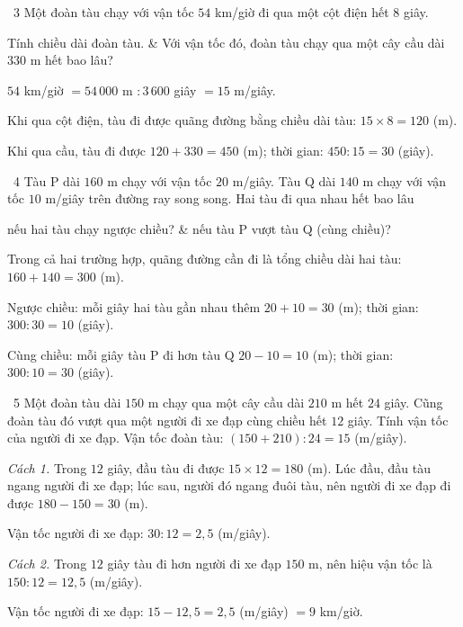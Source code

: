 \gap
\begin{exbox}{\ExWord\ 3}
Một đoàn tàu chạy với vận tốc $54$ km/giờ đi qua một cột điện hết $8$ giây.
\begin{cols2}
 Tính chiều dài đoàn tàu. &  Với vận tốc đó, đoàn tàu chạy qua một cây cầu dài $330$ m hết bao lâu?
\end{cols2}
\guide
$54$ km/giờ $=54\,000$ m $:3\,600$ giây $=15$ m/giây.\par
{} Khi qua cột điện, tàu đi được quãng đường bằng chiều dài tàu: $15\times8=120$ (m).\par
{} Khi qua cầu, tàu đi được $120+330=450$ (m); thời gian: $450:15=30$ (giây).
\end{exbox}
\gap
\begin{exbox}{\ExWord\ 4}
Tàu P dài $160$ m chạy với vận tốc $20$ m/giây. Tàu Q dài $140$ m chạy với vận tốc $10$ m/giây trên đường ray song song. Hai tàu đi qua nhau hết bao lâu
\begin{cols2}
 nếu hai tàu chạy ngược chiều? &  nếu tàu P vượt tàu Q (cùng chiều)?
\end{cols2}
\guide
Trong cả hai trường hợp, quãng đường cần đi là tổng chiều dài hai tàu: $160+140=300$ (m).\par
{} Ngược chiều: mỗi giây hai tàu gần nhau thêm $20+10=30$ (m); thời gian: $300:30=10$ (giây).\par
{} Cùng chiều: mỗi giây tàu P đi hơn tàu Q $20-10=10$ (m); thời gian: $300:10=30$ (giây).
\end{exbox}
\gap
\begin{exbox}{\ExWord\ 5}
Một đoàn tàu dài $150$ m chạy qua một cây cầu dài $210$ m hết $24$ giây. Cũng đoàn tàu đó vượt qua một người đi xe đạp cùng chiều hết $12$ giây. Tính vận tốc của người đi xe đạp.
\guide
Vận tốc đoàn tàu: $(150+210):24=15$ (m/giây).\par\smallskip
\textit{Cách 1.} Trong $12$ giây, đầu tàu đi được $15\times12=180$ (m). Lúc đầu, đầu tàu ngang người đi xe đạp; lúc sau, người đó ngang đuôi tàu, nên người đi xe đạp đi được $180-150=30$ (m).\par
Vận tốc người đi xe đạp: $30:12=2{,}5$ (m/giây).\par\smallskip
\textit{Cách 2.} Trong $12$ giây tàu đi hơn người đi xe đạp $150$ m, nên hiệu vận tốc là $150:12=12{,}5$ (m/giây).\par
Vận tốc người đi xe đạp: $15-12{,}5=2{,}5$ (m/giây) $=9$ km/giờ.
\end{exbox}
